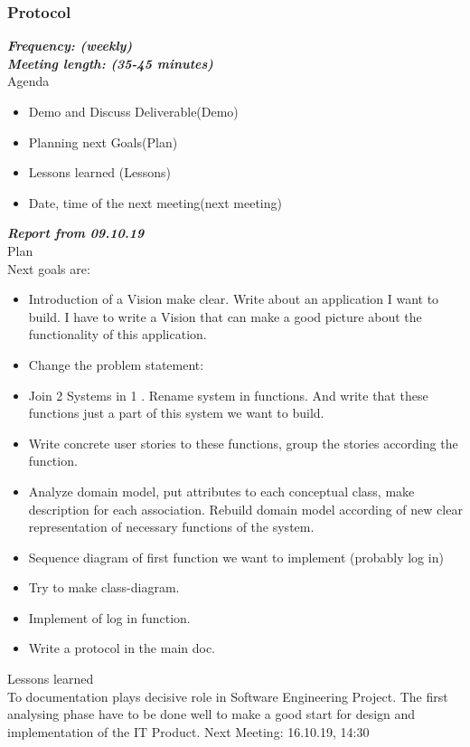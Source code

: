 \documentclass{scrartcl}
\begin{document}
   

   
    
   
  

\subsubsection{Protocol}
\textbf{\textit{Frequency: (weekly) \\
Meeting length: (35-45 minutes)}}\\

Agenda

\begin{itemize}
  	\item Demo and Discuss Deliverable(Demo)
  	\item Planning next Goals(Plan)
  	\item Lessons learned (Lessons)
  	\item Date, time of the next meeting(next meeting)
 \end{itemize} 	


\textbf{\textit{Report from 09.10.19}}\\
Plan\\
Next goals are: 
\begin{itemize}


	\item Introduction of a Vision make clear. Write about an application I want to build. I have to write a Vision that can make a good picture about the functionality of this application.
	\item	Change the problem statement: 
	\item	Join 2 Systems in 1 . Rename system in functions. And write that these functions just a part of this system we want to build. 
	\item	Write concrete user stories to these functions, group the stories according the function.
	\item	Analyze domain model, put attributes to each conceptual class, make description for each association. Rebuild domain model according of new clear representation of necessary functions of the system.
	\item	Sequence diagram of first function we want to implement (probably log in)
	\item	Try to make class-diagram.
	\item	Implement of log in function.
	\item	Write a protocol in the main doc.
\end{itemize}	
Lessons learned\\
To documentation plays decisive role in Software Engineering Project. The first analysing phase have to be done well to make a good start for design and implementation of the IT Product.
Next Meeting: 16.10.19, 14:30\\
\end{document}
